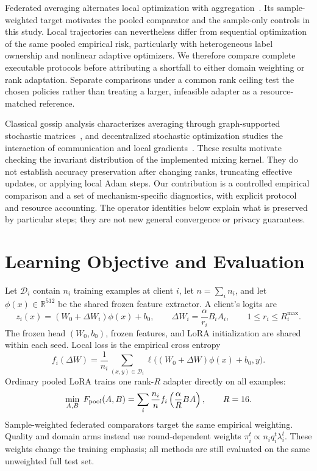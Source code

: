 \documentclass[11pt]{article}
\newcommand{\R}{\mathbb{R}}
\newcommand{\dW}{\Delta W}
\begin{document}
Federated averaging alternates local optimization with aggregation~\citep{mcmahan2017fedavg}. Its sample-weighted target motivates the pooled comparator and the sample-only controls in this study. Local trajectories can nevertheless differ from sequential optimization of the same pooled empirical risk, particularly with heterogeneous label ownership and nonlinear adaptive optimizers. We therefore compare complete executable protocols before attributing a shortfall to either domain weighting or rank adaptation. Separate comparisons under a common rank ceiling test the chosen policies rather than treating a larger, infeasible adapter as a resource-matched reference.

Classical gossip analysis characterizes averaging through graph-supported stochastic matrices~\citep{boyd2006gossip}, and decentralized stochastic optimization studies the interaction of communication and local gradients~\citep{lian2017dpsgd}. These results motivate checking the invariant distribution of the implemented mixing kernel. They do not establish accuracy preservation after changing ranks, truncating effective updates, or applying local Adam steps. Our contribution is a controlled empirical comparison and a set of mechanism-specific diagnostics, with explicit protocol and resource accounting. The operator identities below explain what is preserved by particular steps; they are not new general convergence or privacy guarantees.

\section{Learning Objective and Evaluation}
Let $\mathcal D_i$ contain $n_i$ training examples at client $i$, let $n=\sum_i n_i$, and let $\phi(x)\in\R^{512}$ be the shared frozen feature extractor. A client's logits are
\begin{equation}
 z_i(x)=(W_0+\dW_i)\phi(x)+b_0,
 \qquad \dW_i=\frac{\alpha}{r_i}B_iA_i,
 \qquad 1\le r_i\le R_i^{\max}.
\end{equation}
The frozen head $(W_0,b_0)$, frozen features, and LoRA initialization are shared within each seed. Local loss is the empirical cross entropy
\begin{equation}
 f_i(\dW)=\frac1{n_i}\sum_{(x,y)\in\mathcal D_i}
 \ell\big((W_0+\dW)\phi(x)+b_0,y\big).
\end{equation}
Ordinary pooled LoRA trains one rank-$R$ adapter directly on all examples:
\begin{equation}
 \min_{A,B}\;F_{\rm pool}(A,B)=\sum_i\frac{n_i}{n}
 f_i\left(\frac{\alpha}{R}BA\right),\qquad R=16.
 \label{eq:pooled-objective}
\end{equation}
Sample-weighted federated comparators target the same empirical weighting. Quality and domain arms instead use round-dependent weights $\pi_i^t\propto n_iq_i^t\lambda_i^t$. These weights change the training emphasis; all methods are still evaluated on the same unweighted full test set.
\end{document}
